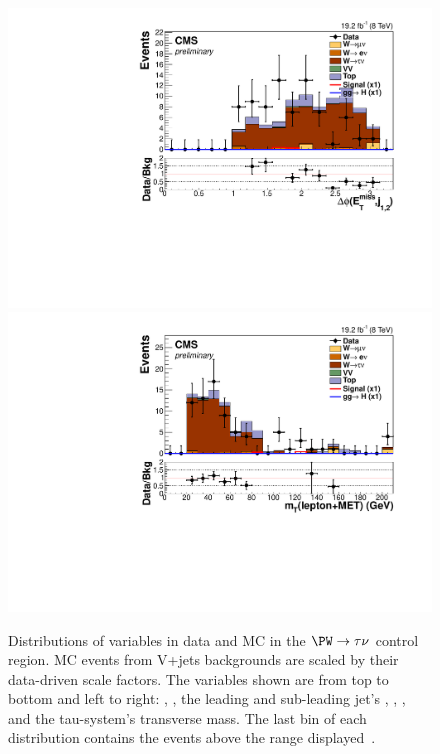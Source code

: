 \begin{figure}
  \includegraphics[width=.65\largefigwidth]{plots/parked/HIG-14-038-figs/output_sigreg/taunu_jetmetnomu_mindphi.pdf}
  \includegraphics[width=.65\largefigwidth]{plots/parked/HIG-14-038-figs/output_sigreg/taunu_lep_mt.pdf}
  \caption[Distributions of variables in data and MC in the $\PW\rightarrow \tau\nu$ control region. MC events from V+jets backgrounds are scaled by their data-driven scale factors. The variables shown are from top to bottom and left to right: \detajj, \Mjj, the leading and sub-leading jet's \pt, \METnoMU, \METsig, \jetmetdphileading and the tau-\MET system's transverse mass. The last bin of each distribution contains the events above the range displayed.]{Distributions of variables in data and MC in the $\PW\rightarrow \tau\nu$ control region. MC events from V+jets backgrounds are scaled by their data-driven scale factors. The variables shown are from top to bottom and left to right: \detajj, \Mjj, the leading and sub-leading jet's \pt, \METnoMU, \METsig, \jetmetdphileading and the tau-\MET system's transverse mass. The last bin of each distribution contains the events above the range displayed~\cite{CMS-PAS-HIG-14-038}.}
  \label{fig:parkedwtaunu}
\end{figure}

